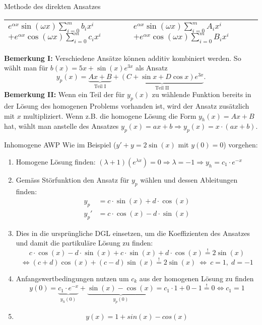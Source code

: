 \begin{Rezept}{Methode des direkten Ansatzes}{}
\begin{center}
\begin{tabularx}{\textwidth}{X|X}
			$e^{\alpha x}\sin(\omega x)\sum_{i=0}^m b_i x^i$\newline$+ e^{\alpha x}\cos(\omega x)\sum_{i=0}^m c_i x^i$ & $e^{\alpha x}\sin(\omega x)\sum_{i=0}^m A_i x^i$\newline$+e^{\alpha x}\cos(\omega x)\sum_{i=0}^m B_i x^i$\\ 
			\hline 
		\end{tabularx} 
	\end{center}
	\textbf{Bemerkung I:} Verschiedene Ansätze können additiv kombiniert werden. So wählt man für $b(x)=5x + \sin(x)e^{3x}$ als Ansatz
	\begin{equation*}
	y_p(x) = \underbrace{Ax + B}_{\text{Teil I}} + \underbrace{(C+\sin x + D \cos x)e^{3x}}_\text{Teil II}.
	\end{equation*}
	\textbf{Bemerkung II:} Wenn ein Teil der für $y_p(x)$ zu wählende Funktion bereits in der Lösung des homogenen Problems vorhanden ist, wird der Ansatz zusätzlich mit $x$ multipliziert. Wenn z.B. die homogene Lösung die Form $y_h(x) = Ax + B$ hat, wählt man anstelle des Ansatzes $y_p(x) = ax+b \Rightarrow y_p(x) = x\cdot(ax+b)$.
\end{Rezept}

\begin{Rezept}{Inhomogene AWP}{}
    Wie im Beispiel ($y' + y = 2\sin(x)$ mit $y(0)=0$) vorgehen:
	\begin{enumerate}
	    \item { Homogene Lösung finden: $(\lambda+1)(e^{\lambda x}) = 0 \Rightarrow \lambda = -1 \Rightarrow y_h = c_1 \cdot e^{-x}$ }
	    \item { Gemäss Störfunktion den Ansatz für $y_p$ wählen und dessen
            Ableitungen finden:
            \begin{align*}
              y_p & = c\cdot \sin(x) + d\cdot \cos(x)\\
              y_p' & = c\cdot \cos(x) - d\cdot \sin(x) 
            \end{align*}
	        }
	    \item { Dies in die ursprüngliche DGL einsetzen, um die Koeffizienten des Ansatzes und damit die partikuläre Lösung zu finden:
	       \[ c \cdot \cos(x) - d\cdot \sin(x) + c\cdot \sin(x) + d\cdot \cos(x) \stackrel{!}{=} 2\sin(x)\] \[ \Leftrightarrow (c+d) \cos(x) + (c-d) \sin(x) \stackrel{!}{=} 2\sin(x) ~ \Longleftrightarrow ~ c=1,\;d=-1 \]
	    }
	    \item{
	        Anfangswertbedingungen nutzen um $c_k$ aus der homogenen Lösung zu finden
	        \[ y(0) = \underbrace{c_1 \cdot e^{-x}}_{y_h(0)} + \underbrace{\sin(x)-\cos(x)}_{y_p(0)} = c_1\cdot1 + 0 - 1 \stackrel{!}{=} 0 \Leftrightarrow c_1 = 1 \]
	    }
	    \item{
	        \[ y(x) = 1 + sin(x) - cos(x) \] 
	   }
	\end{enumerate}
\end{Rezept}

